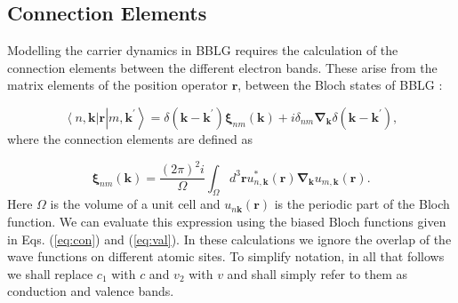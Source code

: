 \documentclass[twocolumn,secnumarabic,amssymb, nobibnotes, aps, prd, superscriptaddress]{revtex4-1}
\begin{document}
\subsection{Connection Elements}
Modelling the carrier dynamics in BBLG requires the calculation of the connection elements between the different electron bands. These arise from the matrix elements of the position operator $\mathbf{r}$, between the Bloch states of BBLG \cite{al2014high, aversa1995nonlinear}:

\begin{equation}
\left\langle n,\mathbf{k}\right.\left|\mathbf{r}\right.\left|m,\mathbf{k}^{\prime}\right\rangle =\delta(\mathbf{k}-\mathbf{k}^{\prime})\mathbf{\xi}_{nm}(\mathbf{k})+i\delta_{nm}\mathbf{\nabla_{k}}\delta(\mathbf{k}-\mathbf{k}^{\prime}),
\label{eq:connection}
\end{equation} where the connection elements are defined as

\begin{equation}
\mathbf{\xi}_{nm}(\mathbf{k})=\frac{\left(2\pi\right)^{2}i}{\Omega}\int_{\Omega}d^{3}\mathbf{r}u_{n,\mathbf{k}}^{\ast}\left(\mathbf{r}\right)\mathbf{\nabla}_{\mathbf{k}}u_{m,\mathbf{k}}\left(\mathbf{r}\right).
\end{equation} 
Here $\Omega$ is the volume of a unit cell and $u_{n\mathbf{k}}(\mathbf{r})$ is the periodic part of the Bloch function. We can evaluate this expression using the biased Bloch functions given in Eqs. (\ref{eq:con}) and (\ref{eq:val}). In these calculations we ignore the overlap of the wave functions on different atomic sites. To simplify notation, in all that follows we shall replace $c_{1}$ with $c$ and $v_{2}$ with $v$ and shall simply refer to them as conduction and valence bands.
\end{document}
